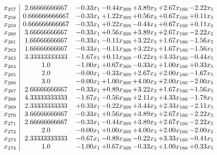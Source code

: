 \documentclass[8pt]{article}
\begin{document}
\[\begin{array}{c| c c@{\hskip 2pt} c@{\hskip 2pt} c@{\hskip 2pt} c@{\hskip 2pt} c@{\hskip 2pt} }
 x_{257}   &  2.66666666667 & -0.33 x_{1} & -0.44 x_{309} & +  3.89 x_{3} & +  2.67 x_{160} & -2.22 x_{5}\\
 x_{258}   &  0.666666666667 & -0.33 x_{1} & +  1.22 x_{309} & +  0.56 x_{3} & +  0.67 x_{160} & +  0.11 x_{5}\\
 x_{259}   &  0.666666666667 & -0.33 x_{1} & +  0.22 x_{309} & -0.44 x_{3} & +  0.67 x_{160} & +  0.11 x_{5}\\
 x_{260}   &  3.66666666667 & -0.33 x_{1} & +  0.56 x_{309} & +  3.89 x_{3} & +  2.67 x_{160} & -2.22 x_{5}\\
 x_{261}   &  1.66666666667 & -0.33 x_{1} & -0.11 x_{309} & +  3.22 x_{3} & +  1.67 x_{160} & -1.56 x_{5}\\
 x_{262}   &  1.66666666667 & -0.33 x_{1} & -0.11 x_{309} & +  3.22 x_{3} & +  1.67 x_{160} & -1.56 x_{5}\\
 x_{263}   &  3.33333333333 & -1.67 x_{1} & +  0.11 x_{309} & -0.22 x_{3} & +  3.33 x_{160} & -0.44 x_{5}\\
 x_{264}   &  1.0 & -1.00 x_{1} & +  0.67 x_{309} & -0.33 x_{3} & +  1.00 x_{160} & +  0.33 x_{5}\\
 x_{265}   &  2.0 & -0.00 x_{1} & -0.33 x_{309} & +  2.67 x_{3} & +  2.00 x_{160} & -1.67 x_{5}\\
 x_{266}   &  3.0 & -0.00 x_{1} & +  1.00 x_{309} & +  4.00 x_{3} & +  2.00 x_{160} & -2.00 x_{5}\\
 x_{267}   &  2.66666666667 & -0.33 x_{1} & +  0.89 x_{309} & +  3.22 x_{3} & +  1.67 x_{160} & -1.56 x_{5}\\
 x_{268}   &  4.33333333333 & -1.67 x_{1} & -0.56 x_{309} & +  2.11 x_{3} & +  4.33 x_{160} & -1.78 x_{5}\\
 x_{269}   &  2.33333333333 & +  0.33 x_{1} & -0.22 x_{309} & +  3.44 x_{3} & +  2.33 x_{160} & -2.11 x_{5}\\
 x_{270}   &  3.66666666667 & -0.33 x_{1} & +  0.56 x_{309} & +  3.89 x_{3} & +  2.67 x_{160} & -2.22 x_{5}\\
 x_{271}   &  2.66666666667 & -0.33 x_{1} & -0.44 x_{309} & +  3.89 x_{3} & +  2.67 x_{160} & -2.22 x_{5}\\
 x_{272}   &  2.0 & -0.00 x_{1} & +  0.00 x_{309} & +  4.00 x_{3} & +  2.00 x_{160} & -2.00 x_{5}\\
 x_{273}   &  2.33333333333 & -0.67 x_{1} & -0.89 x_{309} & -0.22 x_{3} & +  3.33 x_{160} & -0.44 x_{5}\\
 x_{274}   &  1.0 & -1.00 x_{1} & +  0.67 x_{309} & -0.33 x_{3} & +  1.00 x_{160} & +  0.33 x_{5}\\

\end{array}\]
\end{document}
